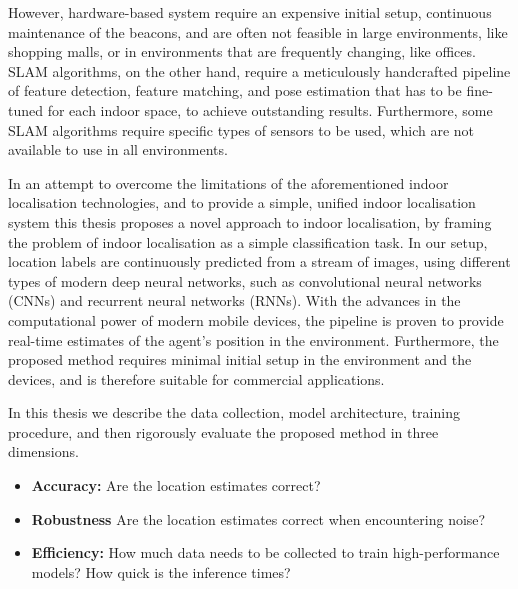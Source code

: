 \documentclass{article}
\begin{document}
  However, hardware-based system require an expensive initial setup, continuous
  maintenance of the beacons, and are often not feasible in large environments,
  like shopping malls, or in environments that are frequently changing, like
  offices. SLAM algorithms, on the other hand, require a meticulously
  handcrafted pipeline of feature detection, feature matching, and pose
  estimation that has to be fine-tuned for each indoor space, to achieve
  outstanding results. Furthermore, some SLAM algorithms require specific types
  of sensors to be used, which are not available to use in all environments.


  In an attempt to overcome the limitations of the aforementioned indoor
  localisation technologies, and to provide a simple, unified indoor
  localisation system this thesis proposes a novel approach to indoor
  localisation, by framing the problem of indoor localisation as a simple
  classification task. In our setup, location labels are continuously predicted
  from a stream of images, using different types of modern deep neural networks,
  such as convolutional neural networks (CNNs) and recurrent neural networks
  (RNNs). With the advances in the computational power of modern mobile devices,
  the pipeline is proven to provide real-time estimates of the agent's position
  in the environment. Furthermore, the proposed method requires minimal initial
  setup in the environment and the devices, and is therefore suitable for
  commercial applications.

  In this thesis we describe the data collection, model architecture, training
  procedure, and then rigorously evaluate the proposed method in three
  dimensions.

  \begin{itemize}
    \item \textbf{Accuracy:} Are the location estimates correct? 
    \item \textbf{Robustness} Are the location estimates correct when
      encountering noise?
    \item \textbf{Efficiency:} How much data needs to be collected to train
      high-performance models? How quick is the inference times?
  \end{itemize} 
\end{document}
